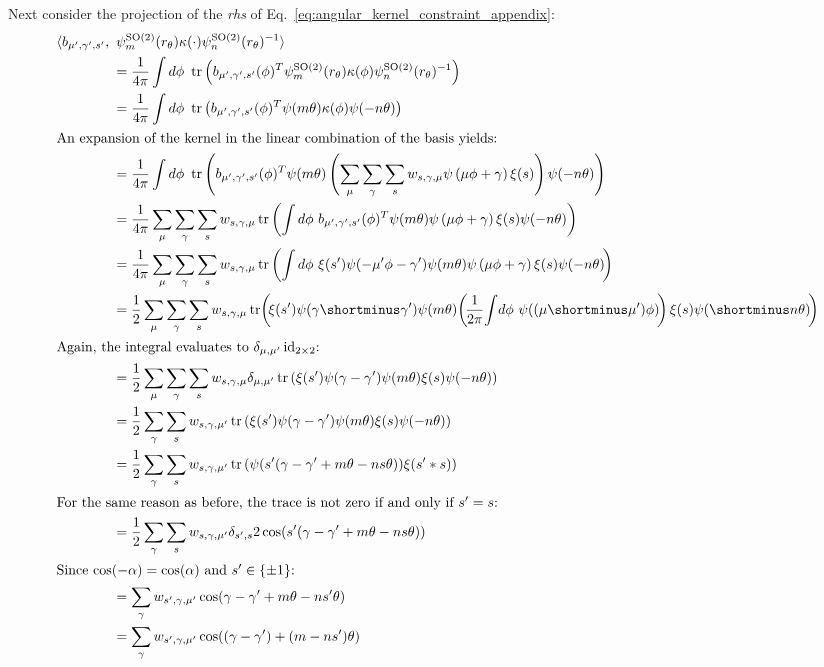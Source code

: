 \documentclass{article}
\newcommand{\lp}{\left(}
\newcommand{\rp}{\right)}
\DeclareMathOperator*{\tr}{\operatorname{tr}}
\newcommand{\SO}[1]{\ensuremath{\operatorname{SO}(#1)}}
\begin{document}
Next consider the projection of the \textit{rhs} of Eq.~\eqref{eq:angular_kernel_constraint_appendix}:
\begin{align*}
&\langle b_{\mu',\gamma',s'},\ \psi_m^{\SO2}(r_\theta)\kappa(\cdot) \psi_n^{\SO2}(r_\theta)^{-1} \rangle \\
&\qquad\qquad= {1\over4\pi}\int d\phi \ \tr\lp  b_{\mu',\gamma',s'}(\phi)^T \psi_m^{\SO2}(r_\theta)\kappa(\phi) \psi_n^{\SO2}(r_\theta)^{-1} \rp \\
&\qquad\qquad= {1\over4\pi}\int d\phi \ \tr\lp  b_{\mu',\gamma',s'}(\phi)^T \psi(m\theta)\kappa(\phi) \psi(-n\theta) \rp \\
\intertext{An expansion of the kernel in the linear combination of the basis yields:}
&\qquad\qquad= {1\over4\pi}\int d\phi \ \tr\lp  b_{\mu',\gamma',s'}(\phi)^T \psi(m\theta) \lp \sum_{\mu} \sum_{\gamma} \sum_{s} w_{s, \gamma,\mu} \psi\lp\mu\phi +\gamma\rp \xi(s)\rp \psi(-n\theta) \rp\\
&\qquad\qquad= {1\over4\pi}\sum_{\mu} \sum_{\gamma} \sum_{s} w_{s, \gamma,\mu} \tr\lp \int d\phi \  b_{\mu',\gamma',s'}(\phi)^T \psi(m\theta) \psi\lp\mu\phi +\gamma\rp \xi(s) \psi(-n\theta) \rp\\
&\qquad\qquad= {1\over4\pi}\sum_{\mu} \sum_{\gamma} \sum_{s} w_{s, \gamma,\mu} \tr\lp \int d\phi \  \xi(s') \psi(-\mu'\phi -\gamma') \psi(m\theta) \psi\lp\mu\phi +\gamma\rp \xi(s) \psi(-n\theta) \!\rp\\
&\qquad\qquad= {1\over2}\sum_{\mu} \sum_{\gamma} \sum_{s} w_{s, \gamma,\mu} \tr\!\lp\!\xi(s') \psi(\gamma\shortminus\gamma') \psi(m\theta) \!\lp\!{1\over2\pi}\!\int\! d\phi \ \psi((\mu\shortminus\mu')\phi) \!\rp \xi(s) \psi(\shortminus n\theta) \!\rp\\
\intertext{Again, the integral evaluates to $\delta_{\mu,\mu'} \operatorname{id}_{2\times2}$:}
&\qquad\qquad= {1\over2}\sum_{\mu} \sum_{\gamma} \sum_{s} w_{s, \gamma,\mu} \delta_{\mu,\mu'} \tr\lp  \xi(s') \psi(\gamma -\gamma') \psi(m\theta) \xi(s) \psi(-n\theta) \rp\\
&\qquad\qquad= {1\over2} \sum_{\gamma} \sum_{s} w_{s, \gamma,\mu'} \tr\lp  \xi(s') \psi(\gamma -\gamma') \psi(m\theta) \xi(s) \psi(-n\theta) \rp\\
&\qquad\qquad= {1\over2} \sum_{\gamma} \sum_{s} w_{s, \gamma,\mu'} \tr\lp  \psi(s'(\gamma -\gamma' +m\theta -ns\theta)) \xi(s'*s) \rp\\
\intertext{For the same reason as before, the trace is not zero if and only if $s'=s$:}
&\qquad\qquad= {1\over2} \sum_{\gamma} \sum_{s} w_{s, \gamma,\mu'} \delta_{s',s} 2\cos(s'(\gamma -\gamma' +m\theta -ns\theta))\\
\intertext{Since $\cos(-\alpha) = \cos(\alpha)$ and $s' \in \{\pm1\}$:}
&\qquad\qquad= \sum_{\gamma} w_{s', \gamma,\mu'} \cos(\gamma -\gamma' +m\theta -ns'\theta)\\
&\qquad\qquad= \sum_{\gamma} w_{s', \gamma,\mu'} \cos((\gamma - \gamma') + (m -ns')\theta)
\end{align*}
	
\end{document}
